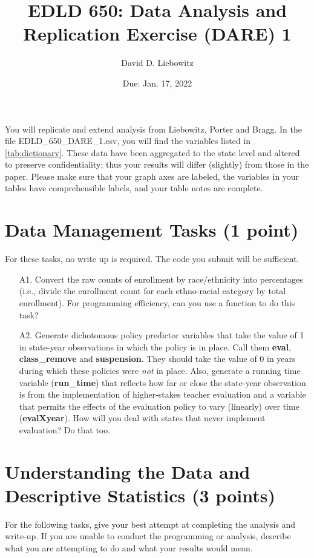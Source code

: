 \documentclass[a4paper, 11pt]{article}
\title{EDLD 650: Data Analysis and Replication Exercise (DARE) 1}
\author{David D. Liebowitz}
\date{Due: Jan. 17, 2022}
\begin{document}
\maketitle

You will replicate and extend analysis from Liebowitz, Porter and Bragg. In the file EDLD\_650\_DARE\_1.csv, you will find the variables listed in \autoref{tab:dictionary}. These data have been aggregated to the state level and altered to preserve confidentiality; thus your results will differ (slightly) from those in the paper. Please make sure that your graph axes are labeled, the variables in your tables have comprehensible labels, and your table notes are complete.



\section{Data Management Tasks (1 point)}
For these tasks, no write up is required. The code you submit will be sufficient.

\begin{enumerate}
	\item[A1.] Convert the raw counts of enrollment by race/ethnicity into percentages (i.e., divide the enrollment count for each ethno-racial category by total enrollment). For programming efficiency, can you use a function to do this task?
	\item[A2.] Generate dichotomous policy predictor variables that take the value of 1 in state-year observations in which the policy is in place. Call them \textbf{eval}, \textbf{class\_remove} and \textbf{suspension}. They should take the value of 0 in years during which these policies were \textit{not} in place. Also, generate a running time variable (\textbf{run\_time}) that reflects how far or close the state-year observation is from the implementation of higher-stakes teacher evaluation and a variable that permits the effects of the evaluation policy to vary (linearly) over time (\textbf{evalXyear}). How will you deal with states that never implement evaluation? Do that too.
\end{enumerate}

\section{Understanding the Data and Descriptive Statistics (3 points)}
For the following tasks, give your best attempt at completing the analysis and write-up. If you are unable to conduct the programming or analysis, describe what you are attempting to do and what your results would mean.
\end{document}
